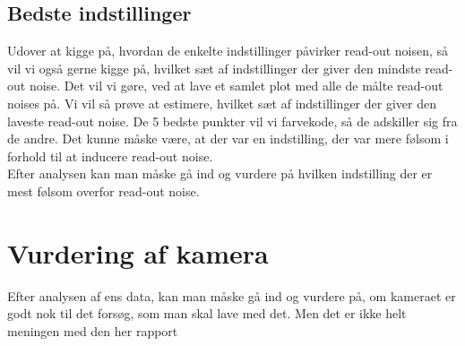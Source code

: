 \documentclass[working]{tuftebook}
\begin{document}
\subsection{Bedste indstillinger}
Udover at kigge på, hvordan de enkelte indstillinger påvirker read-out noisen, så  vil vi også gerne kigge på, hvilket sæt af indstillinger der giver den mindste read-out noise. Det vil vi gøre, ved at lave et samlet plot med alle de målte read-out noises på. Vi vil så prøve at estimere, hvilket sæt af indstillinger der giver den laveste read-out noise. De 5 bedste punkter vil vi farvekode, så de adskiller sig fra de andre. Det kunne måske være, at der var en indstilling, der var mere følsom i forhold til at inducere read-out noise. 
\\
Efter analysen kan man måske gå ind og vurdere på hvilken indstilling der er mest følsom overfor read-out noise. 

\section{Vurdering af kamera}
Efter analysen af ens data, kan man måske gå ind og vurdere på, om kameraet er godt nok til det forsøg, som man skal lave med det. Men det er ikke helt meningen med den her rapport
\end{document}
